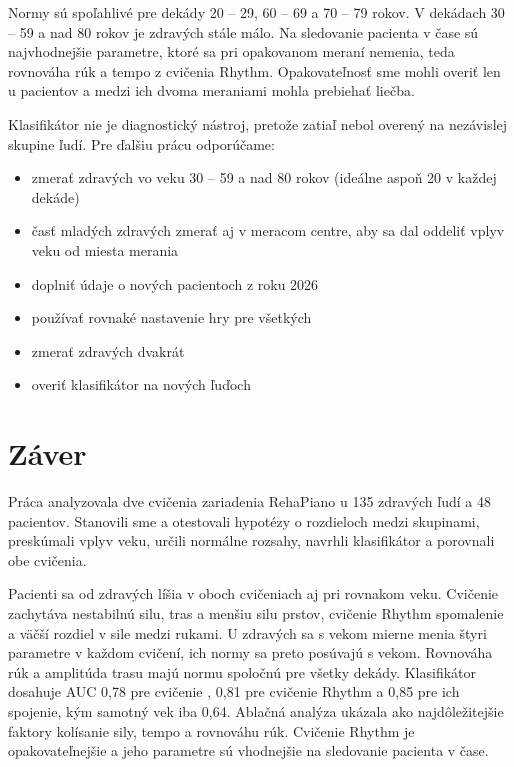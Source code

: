 \documentclass[12pt,a4paper]{article}
\begin{document}
Normy sú spoľahlivé pre dekády 20 -- 29, 60 -- 69 a 70 -- 79 rokov. V dekádach 30 -- 59 a nad 80 rokov je
zdravých stále málo. Na sledovanie pacienta v čase sú najvhodnejšie parametre, ktoré sa pri opakovanom meraní
nemenia, teda rovnováha rúk a tempo z cvičenia Rhythm. Opakovateľnosť sme mohli overiť len u pacientov
a medzi ich dvoma meraniami mohla prebiehať liečba.

Klasifikátor nie je diagnostický nástroj, pretože zatiaľ nebol overený na nezávislej skupine ľudí. Pre ďalšiu prácu
odporúčame:
\begin{itemize}
  \item zmerať zdravých vo veku 30 -- 59 a nad 80 rokov (ideálne aspoň 20 v každej dekáde)
  \item časť mladých zdravých zmerať aj v meracom centre, aby sa dal oddeliť vplyv veku od miesta merania
  \item doplniť údaje o nových pacientoch z roku 2026
  \item používať rovnaké nastavenie hry pre všetkých
  \item zmerať zdravých dvakrát
  \item overiť klasifikátor na nových ľuďoch
\end{itemize}

\section*{Záver}

Práca analyzovala dve cvičenia zariadenia RehaPiano u 135 zdravých ľudí a 48 pacientov. Stanovili sme a otestovali
hypotézy o rozdieloch medzi skupinami, preskúmali vplyv veku, určili normálne rozsahy, navrhli klasifikátor
a porovnali obe cvičenia.

Pacienti sa od zdravých líšia v oboch cvičeniach aj pri rovnakom veku. Cvičenie \ef{} zachytáva nestabilnú silu, tras
a menšiu silu prstov, cvičenie Rhythm spomalenie a väčší rozdiel v sile medzi rukami. U zdravých sa s vekom mierne menia štyri parametre
v každom cvičení, ich normy sa preto posúvajú s vekom. Rovnováha rúk a amplitúda trasu majú normu spoločnú pre všetky
dekády. Klasifikátor dosahuje AUC 0,78 pre cvičenie \ef{}, 0,81 pre cvičenie Rhythm a 0,85 pre ich spojenie, kým samotný
vek iba 0,64. Ablačná analýza ukázala ako najdôležitejšie
faktory kolísanie sily, tempo a rovnováhu rúk. Cvičenie Rhythm je opakovateľnejšie a jeho parametre sú vhodnejšie na
sledovanie pacienta v čase.
\end{document}
